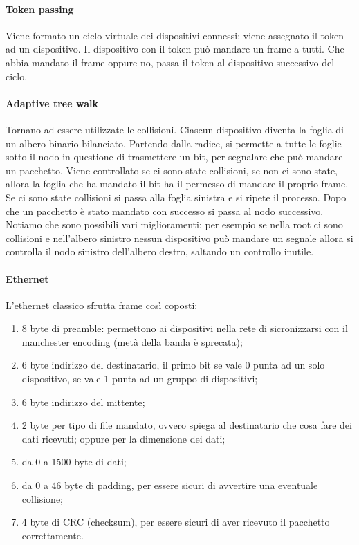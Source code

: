\documentclass{article}
\begin{document}
\paragraph{Token passing}
Viene formato un ciclo virtuale dei dispositivi connessi; viene assegnato il
token ad un dispositivo. Il dispositivo con il token può mandare un frame a
tutti. Che abbia mandato il frame oppure no, passa il token al dispositivo
successivo del ciclo.

\paragraph{Adaptive tree walk}
Tornano ad essere utilizzate le collisioni. Ciascun dispositivo diventa la
foglia di un albero binario bilanciato. Partendo dalla radice, si permette a
tutte le foglie sotto il nodo in questione di trasmettere un bit, per segnalare
che può mandare un pacchetto. Viene controllato se ci sono state collisioni,
se non ci sono state, allora la foglia che ha mandato il bit ha il permesso di
mandare il proprio frame. Se ci sono state collisioni si passa alla foglia
sinistra e si ripete il processo. Dopo che un pacchetto è stato mandato con
successo si passa al nodo successivo. Notiamo che sono possibili vari
miglioramenti: per esempio se nella root ci sono collisioni e nell'albero
sinistro nessun dispositivo può mandare un segnale allora si controlla il nodo
sinistro dell'albero destro, saltando un controllo inutile.

\paragraph{Ethernet}
L'ethernet classico sfrutta frame così coposti:
\begin{enumerate}
	\item 8 byte di preamble: permettono ai dispositivi nella rete di
	      sicronizzarsi con il manchester encoding (metà della banda è sprecata);

	\item 6 byte indirizzo del destinatario, il primo bit se vale 0 punta ad un
	      solo dispositivo, se vale 1 punta ad un gruppo di dispositivi;

	\item 6 byte indirizzo del mittente;

	\item 2 byte per tipo di file mandato, ovvero spiega al destinatario che
	      cosa fare dei dati ricevuti; oppure per la dimensione dei dati;

	\item da 0 a 1500 byte di dati;

	\item da 0 a 46 byte di padding, per essere sicuri di avvertire una
	      eventuale collisione;

	\item 4 byte di CRC (checksum), per essere sicuri di aver ricevuto il pacchetto
	      correttamente.
\end{enumerate}
\end{document}
